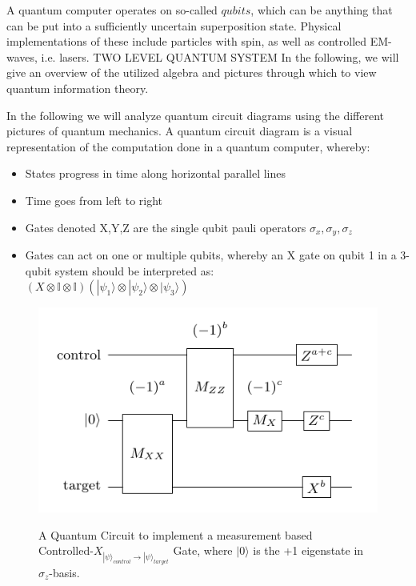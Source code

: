 A quantum computer operates on so-called $qubits$, which can be
anything that can be put into a sufficiently uncertain superposition
state. Physical implementations of these include particles with 
spin, as well as controlled EM-waves, i.e. lasers. TWO LEVEL QUANTUM SYSTEM
In the following, we will give an overview of the utilized
algebra and pictures through which to view quantum information theory.

In the following we will analyze quantum circuit diagrams using the different
pictures of quantum mechanics.
A quantum circuit diagram is a visual representation of the computation done
in a quantum computer, whereby:
\begin{itemize}
	\item States progress in time along horizontal parallel lines
	\item Time goes from left to right
	\item Gates denoted X,Y,Z are the single qubit pauli operators
		$\sigma_x,\sigma_y,\sigma_z$
	\item Gates can act on one or multiple qubits, whereby an X gate 
		on qubit 1 in a 3-qubit system should be interpreted as:
		\\$(X\otimes \mathbb{I} \otimes \mathbb{I}) (|\psi_1\rangle
		\otimes |\psi_2\rangle \otimes |\psi_3\rangle)$
\end{itemize}
\begin{figure}[h!]
	\begin{center}
	\captionsetup{justification=centering,margin=2cm}
	\includegraphics[scale=0.4]{img/cnotMeasureCircuit.png}\\
	\caption{A Quantum Circuit to implement a measurement based\\
		Controlled-$X_{|\psi\rangle_{control}\rightarrow |\psi\rangle_{target}}$ Gate,
		where $|0\rangle$ is the +1 eigenstate in $\sigma_{z}$-basis.}
	\label{fig:circuit1}
	\end{center}
\end{figure}

\newpage
